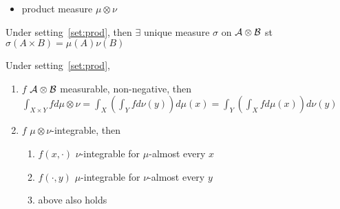 \begin{itemize}
    \item product measure $\mu \otimes \nu$
\end{itemize}

\begin{prop}
    Under setting~\ref{set:prod}, then $\exists$ unique measure $\sigma$ on $\mathcal{A} \otimes \mathcal{B}$ st $\sigma(A \times B) = \mu(A)\nu(B)$
\end{prop}

\begin{thm}
    Under setting~\ref{set:prod},
    \begin{enumerate}
        \item $f$ $\mathcal{A} \otimes \mathcal{B}$ measurable, non-negative, then $\int_{X \times Y} f d\mu \otimes \nu = \int_X \left( \int_Y f d\nu(y) \right) d\mu(x) = \int_Y \left( \int_X f d\mu(x) \right) d\nu(y)$
        \item $f$ $\mu \otimes \nu$-integrable, then
        \begin{enumerate}
            \item $f(x, \cdot)$ $\nu$-integrable for $\mu$-almost every $x$
            \item $f(\cdot, y)$ $\mu$-integrable for $\nu$-almost every $y$
            \item above also holds
        \end{enumerate}
    \end{enumerate}
\end{thm}